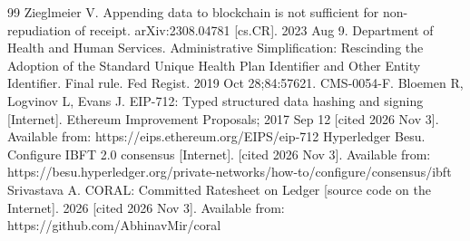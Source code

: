 \documentclass[10pt]{article}
\begin{document}
\begin{thebibliography}{99}
 Zieglmeier V. Appending data to blockchain is not sufficient for non-repudiation of receipt. arXiv:2308.04781 [cs.CR]. 2023 Aug 9.
 Department of Health and Human Services. Administrative Simplification: Rescinding the Adoption of the Standard Unique Health Plan Identifier and Other Entity Identifier. Final rule. Fed Regist. 2019 Oct 28;84:57621. CMS-0054-F.
 Bloemen R, Logvinov L, Evans J. EIP-712: Typed structured data hashing and signing [Internet]. Ethereum Improvement Proposals; 2017 Sep 12 [cited 2026 Nov 3]. Available from: https://eips.ethereum.org/EIPS/eip-712
 Hyperledger Besu. Configure IBFT 2.0 consensus [Internet]. [cited 2026 Nov 3]. Available from: https://besu.hyperledger.org/private-networks/how-to/configure/consensus/ibft
 Srivastava A. CORAL: Committed Ratesheet on Ledger [source code on the Internet]. 2026 [cited 2026 Nov 3]. Available from: https://github.com/AbhinavMir/coral
\end{thebibliography}

\ifdefined\submission\else\clearpage\fi
\end{document}
